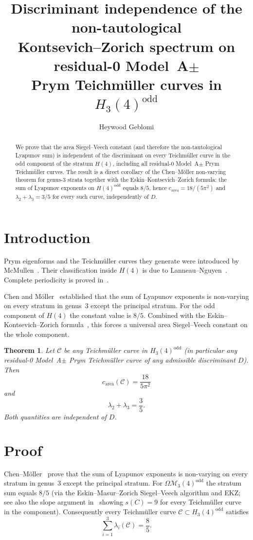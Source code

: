 \documentclass[11pt,a4paper]{article}
\title{Discriminant independence of the non-tautological\\
Kontsevich--Zorich spectrum on residual-0 Model~A$\pm$\\
Prym Teichm\"uller curves in $H_3(4)^{\mathrm{odd}}$}
\author{Heywood Geblomi}
\date{}
\newtheorem{theorem}{Theorem}
\theoremstyle{definition}
\theoremstyle{remark}
\begin{document}
\maketitle

\begin{abstract}
We prove that the area Siegel--Veech constant (and therefore the non-tautological
Lyapunov sum) is independent of the discriminant on every Teichm\"uller curve in
the odd component of the stratum $H(4)$, including all residual-0 Model~A$\pm$
Prym Teichm\"uller curves. The result is a direct corollary of the Chen--M\"oller
non-varying theorem for genus-3 strata together with the Eskin--Kontsevich--Zorich
formula: the sum of Lyapunov exponents on $H(4)^{\mathrm{odd}}$ equals $8/5$,
hence $c_{\mathrm{area}}=18/(5\pi^2)$ and $\lambda_2+\lambda_3=3/5$ for every
such curve, independently of $D$.
\end{abstract}

\section{Introduction}

Prym eigenforms and the Teichm\"uller curves they generate were introduced by
McMullen~\cite{McM06}. Their classification inside $H(4)$ is due to
Lanneau--Nguyen~\cite{LN14}. Complete periodicity is proved in~\cite{LN16}.

Chen and M\"oller~\cite{CM12} established that the sum of Lyapunov exponents is
non-varying on every stratum in genus~3 except the principal stratum. For the
odd component of $H(4)$ the constant value is $8/5$. Combined with the
Eskin--Kontsevich--Zorich formula~\cite{EKZ14}, this forces a universal area
Siegel--Veech constant on the whole component.

\begin{theorem}
\label{thm:main}
Let $\mathcal{C}$ be any Teichm\"uller curve in $H_3(4)^{\mathrm{odd}}$
(in particular any residual-0 Model~A$\pm$ Prym Teichm\"uller curve of any
admissible discriminant $D$). Then
\[
c_{\mathrm{area}}(\mathcal{C})=\frac{18}{5\pi^2}
\]
and
\[
\lambda_2+\lambda_3=\frac{3}{5}.
\]
Both quantities are independent of $D$.
\end{theorem}

\section{Proof}

Chen--M\"oller~\cite[Theorem~1.1]{CM12} prove that the sum of Lyapunov exponents
is non-varying on every stratum in genus~3 except the principal stratum.
For $\Omega\mathcal{M}_3(4)^{\mathrm{odd}}$ the stratum sum equals $8/5$
(via the Eskin--Masur--Zorich Siegel--Veech algorithm and EKZ; see also the
slope argument in~\cite[\S6]{CM12} showing $s(C)=9$ for every Teichm\"uller
curve in the component). Consequently every Teichm\"uller curve
$\mathcal{C}\subset H_3(4)^{\mathrm{odd}}$ satisfies
\[
\sum_{i=1}^{3}\lambda_i(\mathcal{C})=\frac{8}{5}.
\]
\end{document}
